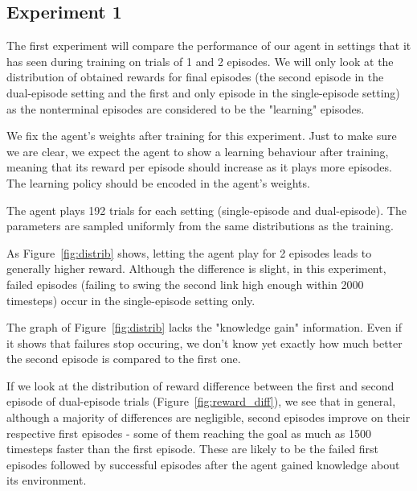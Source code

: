 \documentclass[letterpaper]{article}
\begin{document}
\subsection{Experiment 1}
The first experiment will compare the performance of our agent in settings
that it has seen during training on trials of 1 and 2 episodes. We will only
look at the distribution of obtained rewards for final episodes (the second 
episode in the dual-episode setting and the first and only episode in the
single-episode setting) as the nonterminal episodes are considered to be the 
"learning" episodes.

We fix the agent's weights after training for this experiment. Just to make sure
we are clear, we expect the agent to show a learning behaviour after training,
meaning that its reward per episode should increase as it plays more episodes.
The learning policy should be encoded in the agent's weights.

The agent plays 192 trials for each setting (single-episode and dual-episode).
The parameters are sampled uniformly from the same distributions as the training.

As Figure~\ref{fig:distrib} shows, letting the agent play for 2 episodes
leads to generally higher reward. Although the difference is slight, 
in this experiment, failed episodes (failing
to swing the second link high enough within 2000 timesteps) occur in the
single-episode setting only.

The graph of Figure~\ref{fig:distrib} lacks the "knowledge gain" information.
Even if it shows that failures stop occuring, we don't know yet exactly how
much better the second episode is compared to the first one.

If we look at the distribution of reward difference between the first
and second episode of dual-episode trials (Figure~\ref{fig:reward_diff}), we 
see that in general, although a majority of differences are negligible,
second episodes improve on their respective first episodes - some of them
reaching the goal as much as 1500 timesteps faster than the first episode. These
are likely to be the failed first episodes followed by successful episodes
after the agent gained knowledge about its environment.
\end{document}
